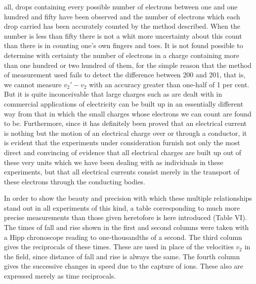 all, drops containing every possible number of electrons between one and
one hundred and fifty have been observed and the number of electrons
which each drop carried has been accurately counted by the method
described. When the number is less than fifty there is not a whit more
uncertainty about this count than there is in counting one's own fingers
and toes. It is not found possible to determine with certainty the
number of electrons in a charge containing more than one hundred or two
hundred of them, for the simple reason that the method of measurement
used fails to detect the difference between 200 and 201, that is, we
cannot measure $v_{2}' - v_2$ with an accuracy greater than
one-half of 1 per cent. But it is quite inconceivable that large charges
such as are dealt with in commercial applications of electricity can be
built up in an es\-sen\-tially different way from that in which the small
charges whose electrons we can count are found to be. Furthermore, since
it has definitely been proved that an electrical current is nothing but
the motion of an electrical charge over or through a conductor, it is
evident that the experiments under consideration furnish not only the
most direct and convincing of evidence that all electrical charges are
built up out of these very units which we have been dealing with as
individuals in these experiments, but that all electrical currents
consist merely in the transport of these electrons through the
conducting bodies.

In order to show the beauty and precision with which these multiple
relationships stand out in all experiments of this kind, a table
corresponding to much more precise measurements than those given
heretofore is here introduced (Table VI). The times of fall and rise
shown in the first and second columns were taken with a Hipp chronoscope
reading to one-thousandths of a second. The third column gives the
reciprocals of these times. These are used in place of the velocities
$v_2$ in the field, since distance of fall and rise is always the
same. The fourth column gives the successive changes in speed due to the
capture of ions. These also are expressed merely as time reciprocals.

